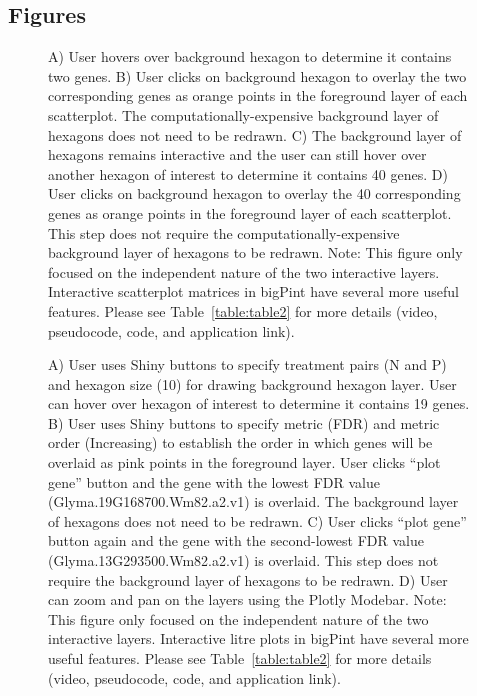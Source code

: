 \documentclass[parskip=full]{bmcart} %
\begin{document}
\begin{backmatter}

\section*{Figures}
\begin{figure}[h!]
\caption{
A) User hovers over background hexagon to determine it contains two genes. B) User clicks on background hexagon to overlay the two corresponding genes as orange points in the foreground layer of each scatterplot. The computationally-expensive background layer of hexagons does not need to be redrawn. C) The background layer of hexagons remains interactive and the user can still hover over another hexagon of interest to determine it contains 40 genes. D) User clicks on background hexagon to overlay the 40 corresponding genes as orange points in the foreground layer of each scatterplot. This step does not require the computationally-expensive background layer of hexagons to be redrawn. Note: This figure only focused on the independent nature of the two interactive layers. Interactive scatterplot matrices in bigPint have several more useful features. Please see Table~\ref{table:table2} for more details (video, pseudocode, code, and application link).}
\label{figureSM}
\end{figure}

\begin{figure}[h!]
\caption{
A) User uses Shiny buttons to specify treatment pairs (N and P) and hexagon size (10) for drawing background hexagon layer. User can hover over hexagon of interest to determine it contains 19 genes. B) User uses Shiny buttons to specify metric (FDR) and metric order (Increasing) to establish the order in which genes will be overlaid as pink points in the foreground layer. User clicks “plot gene” button and the gene with the lowest FDR value (Glyma.19G168700.Wm82.a2.v1) is overlaid. The background layer of hexagons does not need to be redrawn. C) User clicks “plot gene” button again and the gene with the second-lowest FDR value (Glyma.13G293500.Wm82.a2.v1) is overlaid. This step does not require the background layer of hexagons to be redrawn. D) User can zoom and pan on the layers using the Plotly Modebar. Note: This figure only focused on the independent nature of the two interactive layers. Interactive litre plots in bigPint have several more useful features. Please see Table~\ref{table:table2} for more details (video, pseudocode, code, and application link).}
\label{figureLitre}
\end{figure}


\end{backmatter}
\end{document}
